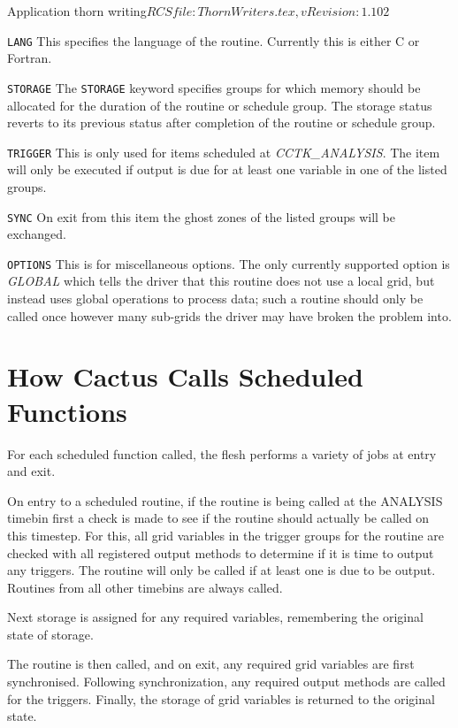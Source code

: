 \begin{cactuspart}{2}{Application thorn writing}{$RCSfile: ThornWriters.tex,v $}{$Revision: 1.102 $}
\begin{Lentry}
\item[\texttt{LANG}]
This specifies the language of the routine.  Currently this is either
C or Fortran.
\item[\texttt{STORAGE}] The {\tt STORAGE} keyword specifies groups for
which memory should be allocated for the duration of the routine or
schedule group.  The storage status reverts to its previous status
after completion of the routine or schedule group.
\item[\texttt{TRIGGER}]
This is only used for items scheduled at {\em CCTK\_ANALYSIS}.  The
item will only be executed if output is due for at least one
variable in one of the listed groups.
\item[\texttt{SYNC}]
On exit from this item the ghost zones of the listed groups will be
exchanged.
\item[\texttt{OPTIONS}]
This is for miscellaneous options.  The only currently supported
option is {\em GLOBAL} which tells the driver that this routine does
not use a local grid, but instead uses global operations to process
data;  such a routine should only be called once however many
sub-grids the driver may have broken the problem into.
\end{Lentry}

\section{How Cactus Calls Scheduled Functions}
\label{scheduling:calling_scheduled_functions}

For each scheduled function called, the flesh performs a variety of jobs at entry and exit.

On entry to a scheduled routine, if the routine is being called at the ANALYSIS timebin first a check is made to see if the routine should actually be called on this timestep. For this, all grid variables in the trigger groups for the routine are checked with all registered output methods to determine if it is time to output any triggers. The routine will only be called if at least one is due to be output. Routines from all other timebins are always called.

Next storage is assigned for any required variables, remembering the original state of storage.

The routine is then called, and on exit, any required grid variables are
first synchronised. Following synchronization, any required output methods are called for the triggers. Finally, the storage of grid variables is returned to the original state.


\end{cactuspart}
